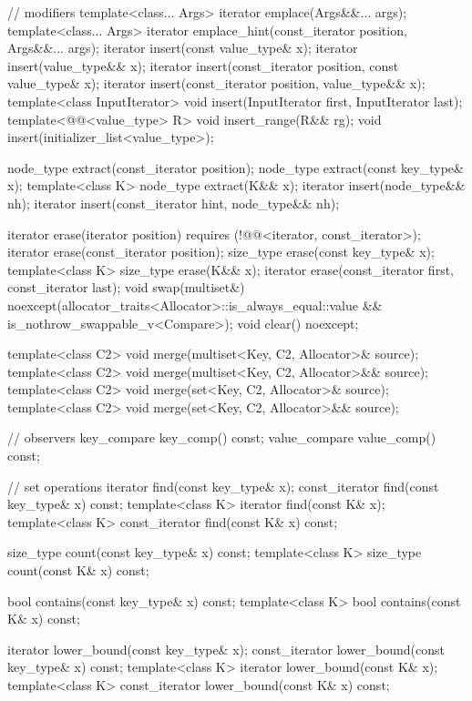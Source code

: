 \begin{codeblock}
{{    // modifiers
    template<class... Args> iterator emplace(Args&&... args);
    template<class... Args> iterator emplace_hint(const_iterator position, Args&&... args);
    iterator insert(const value_type& x);
    iterator insert(value_type&& x);
    iterator insert(const_iterator position, const value_type& x);
    iterator insert(const_iterator position, value_type&& x);
    template<class InputIterator>
      void insert(InputIterator first, InputIterator last);
    template<@@<value_type> R>
      void insert_range(R&& rg);
    void insert(initializer_list<value_type>);

    node_type extract(const_iterator position);
    node_type extract(const key_type& x);
    template<class K> node_type extract(K&& x);
    iterator insert(node_type&& nh);
    iterator insert(const_iterator hint, node_type&& nh);

    iterator  erase(iterator position)
      requires (!@@<iterator, const_iterator>);
    iterator  erase(const_iterator position);
    size_type erase(const key_type& x);
    template<class K> size_type erase(K&& x);
    iterator  erase(const_iterator first, const_iterator last);
    void      swap(multiset&)
      noexcept(allocator_traits<Allocator>::is_always_equal::value &&
               is_nothrow_swappable_v<Compare>);
    void      clear() noexcept;

    template<class C2>
      void merge(multiset<Key, C2, Allocator>& source);
    template<class C2>
      void merge(multiset<Key, C2, Allocator>&& source);
    template<class C2>
      void merge(set<Key, C2, Allocator>& source);
    template<class C2>
      void merge(set<Key, C2, Allocator>&& source);

    // observers
    key_compare key_comp() const;
    value_compare value_comp() const;

    // set operations
    iterator       find(const key_type& x);
    const_iterator find(const key_type& x) const;
    template<class K> iterator       find(const K& x);
    template<class K> const_iterator find(const K& x) const;

    size_type      count(const key_type& x) const;
    template<class K> size_type count(const K& x) const;

    bool           contains(const key_type& x) const;
    template<class K> bool contains(const K& x) const;

    iterator       lower_bound(const key_type& x);
    const_iterator lower_bound(const key_type& x) const;
    template<class K> iterator       lower_bound(const K& x);
    template<class K> const_iterator lower_bound(const K& x) const;

}}
\end{codeblock}
